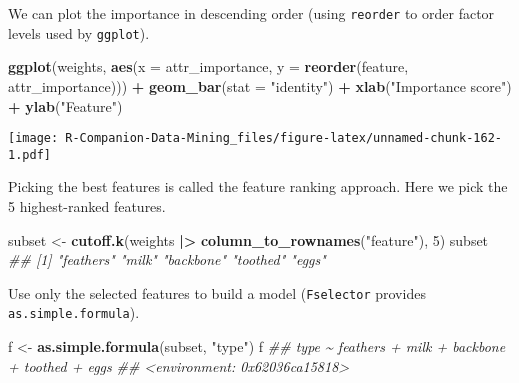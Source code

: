 \documentclass[
  notitlepage]{book}
\newenvironment{Shaded}{\begin{snugshade}}{\end{snugshade}}
\newcommand{\CommentTok}[1]{\textcolor[rgb]{0.56,0.35,0.01}{\textit{#1}}}
\newcommand{\DataTypeTok}[1]{\textcolor[rgb]{0.13,0.29,0.53}{#1}}
\newcommand{\DecValTok}[1]{\textcolor[rgb]{0.00,0.00,0.81}{#1}}
\newcommand{\ErrorTok}[1]{\textcolor[rgb]{0.64,0.00,0.00}{\textbf{#1}}}
\newcommand{\KeywordTok}[1]{\textcolor[rgb]{0.13,0.29,0.53}{\textbf{#1}}}
\newcommand{\NormalTok}[1]{#1}
\newcommand{\OperatorTok}[1]{\textcolor[rgb]{0.81,0.36,0.00}{\textbf{#1}}}
\newcommand{\StringTok}[1]{\textcolor[rgb]{0.31,0.60,0.02}{#1}}
\begin{document}
We can plot the importance in descending order (using \texttt{reorder} to order factor
levels used by \texttt{ggplot}).

\begin{Shaded}
\begin{Highlighting}[]
\KeywordTok{ggplot}\NormalTok{(weights,}
  \KeywordTok{aes}\NormalTok{(}\DataTypeTok{x =}\NormalTok{ attr\_importance, }
      \DataTypeTok{y =} \KeywordTok{reorder}\NormalTok{(feature, attr\_importance))) }\OperatorTok{+}
\StringTok{  }\KeywordTok{geom\_bar}\NormalTok{(}\DataTypeTok{stat =} \StringTok{"identity"}\NormalTok{) }\OperatorTok{+}
\StringTok{  }\KeywordTok{xlab}\NormalTok{(}\StringTok{"Importance score"}\NormalTok{) }\OperatorTok{+}\StringTok{ }
\StringTok{  }\KeywordTok{ylab}\NormalTok{(}\StringTok{"Feature"}\NormalTok{)}
\end{Highlighting}
\end{Shaded}

\texttt{[image: R-Companion-Data-Mining\_files/figure-latex/unnamed-chunk-162-1.pdf]}

Picking the best features is called the feature ranking approach.
Here we pick the 5 highest-ranked features.

\begin{Shaded}
\begin{Highlighting}[]
\NormalTok{subset \textless{}{-}}\StringTok{ }\KeywordTok{cutoff.k}\NormalTok{(weights }\OperatorTok{|}\ErrorTok{\textgreater{}}\StringTok{ }
\StringTok{                   }\KeywordTok{column\_to\_rownames}\NormalTok{(}\StringTok{"feature"}\NormalTok{), }
                   \DecValTok{5}\NormalTok{)}
\NormalTok{subset}
\CommentTok{\#\# [1] "feathers" "milk"     "backbone" "toothed"  "eggs"}
\end{Highlighting}
\end{Shaded}

Use only the selected features to build a model (\texttt{Fselector} provides
\texttt{as.simple.formula}).

\begin{Shaded}
\begin{Highlighting}[]
\NormalTok{f \textless{}{-}}\StringTok{ }\KeywordTok{as.simple.formula}\NormalTok{(subset, }\StringTok{"type"}\NormalTok{)}
\NormalTok{f}
\CommentTok{\#\# type \textasciitilde{} feathers + milk + backbone + toothed + eggs}
\CommentTok{\#\# \textless{}environment: 0x62036ca15818\textgreater{}}
\end{Highlighting}
\end{Shaded}
\end{document}
